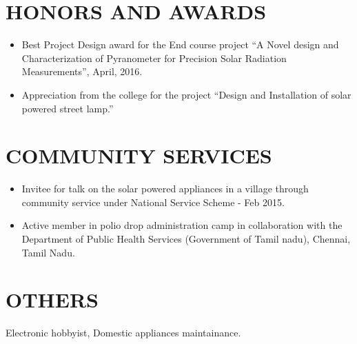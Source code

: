 \documentclass[line,margin,12pt ]{res}
\begin{document}
\begin{resume}
\section{HONORS AND AWARDS}\vspace*{-0.48 cm}
\begin{itemize}
    \item Best Project Design award for the End course project \textquotedblleft A Novel design and Characterization of Pyranometer for Precision Solar Radiation Measurements\textquotedblright, April, 2016.
    \item Appreciation from the college for the project \textquotedblleft Design and Installation of solar powered street lamp.\textquotedblright
\end{itemize}


\section{COMMUNITY SERVICES} \vspace*{-0.48 cm}
\begin{itemize}
    \item Invitee for talk on the solar powered appliances in a village through \\ community service under National Service Scheme - Feb 2015.       
\item Active member in polio drop administration camp in collaboration with the Department of Public Health  Services (Government of Tamil nadu), Chennai, Tamil Nadu.
\end{itemize} 


\section{OTHERS}
Electronic hobbyist, Domestic appliances maintainance.



\end{resume}
\end{document}
